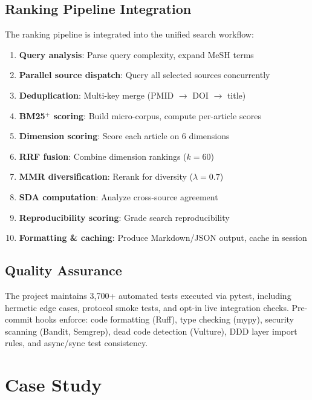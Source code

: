 \documentclass[11pt,a4paper]{article}
\begin{document}
\subsection{Ranking Pipeline Integration}

The ranking pipeline is integrated into the unified search workflow:

\begin{enumerate}
    \item \textbf{Query analysis}: Parse query complexity, expand MeSH terms
    \item \textbf{Parallel source dispatch}: Query all selected sources concurrently
    \item \textbf{Deduplication}: Multi-key merge (PMID $\rightarrow$ DOI $\rightarrow$ title)
    \item \textbf{BM25$^{+}$ scoring}: Build micro-corpus, compute per-article scores
    \item \textbf{Dimension scoring}: Score each article on 6 dimensions
    \item \textbf{RRF fusion}: Combine dimension rankings ($k=60$)
    \item \textbf{MMR diversification}: Rerank for diversity ($\lambda=0.7$)
    \item \textbf{SDA computation}: Analyze cross-source agreement
    \item \textbf{Reproducibility scoring}: Grade search reproducibility
    \item \textbf{Formatting \& caching}: Produce Markdown/JSON output, cache in session
\end{enumerate}

\subsection{Quality Assurance}

The project maintains 3{,}700+ automated tests executed via pytest, including hermetic edge cases, protocol smoke tests, and opt-in live integration checks.
Pre-commit hooks enforce: code formatting (Ruff), type checking (mypy), security scanning (Bandit, Semgrep), dead code detection (Vulture), DDD layer import rules, and async/sync test consistency.

\section{Case Study}
\label{sec:evaluation}
\end{document}
